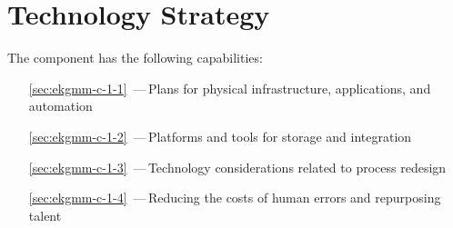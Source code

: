 \chapter{Technology Strategy}\label{ch:ekg-mm-c-1}

The  component has the following capabilities:

\begin{itemize}[leftmargin=.5in]
  \item [\ref{sec:ekgmm-c-1-1}] \,---\,Plans for physical infrastructure, applications, and automation
  \item [\ref{sec:ekgmm-c-1-2}] \,---\,Platforms and tools for storage and integration
  \item [\ref{sec:ekgmm-c-1-3}] \,---\,Technology considerations related to process redesign
  \item [\ref{sec:ekgmm-c-1-4}] \,---\,Reducing the costs of human errors and repurposing talent
\end{itemize}





